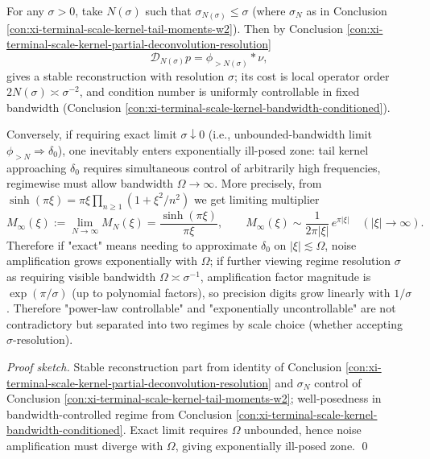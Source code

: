 \begin{conclusion}\label{con:xi-terminal-scale-kernel-two-regime-recoverability}
For any \(\sigma>0\), take \(N(\sigma)\) such that \(\sigma_{N(\sigma)}\le\sigma\) (where \(\sigma_N\) as in Conclusion \ref{con:xi-terminal-scale-kernel-tail-moments-w2}).
Then by Conclusion \ref{con:xi-terminal-scale-kernel-partial-deconvolution-resolution}
\[
\mathcal D_{N(\sigma)}p=\phi_{>N(\sigma)}*\nu,
\]
gives a stable reconstruction with resolution \(\sigma\); its cost is local operator order \(2N(\sigma)\asymp\sigma^{-2}\), and condition number is uniformly controllable in fixed bandwidth (Conclusion \ref{con:xi-terminal-scale-kernel-bandwidth-conditioned}).
\par
Conversely, if requiring exact limit \(\sigma\downarrow 0\) (i.e., unbounded-bandwidth limit \(\phi_{>N}\Rightarrow\delta_0\)), one inevitably enters exponentially ill-posed zone: tail kernel approaching \(\delta_0\) requires simultaneous control of arbitrarily high frequencies, regimewise must allow bandwidth \(\Omega\to\infty\).
More precisely, from \(\sinh(\pi\xi)=\pi\xi\prod_{n\ge 1}(1+\xi^2/n^2)\) we get limiting multiplier
\[
M_\infty(\xi):=\lim_{N\to\infty}M_N(\xi)=\frac{\sinh(\pi\xi)}{\pi\xi},
\qquad
M_\infty(\xi)\sim \frac{1}{2\pi|\xi|}\,e^{\pi|\xi|}\quad(|\xi|\to\infty).
\]
Therefore if "exact" means needing to approximate \(\delta_0\) on \(|\xi|\lesssim \Omega\), noise amplification grows exponentially with \(\Omega\);
if further viewing regime resolution \(\sigma\) as requiring visible bandwidth \(\Omega\asymp \sigma^{-1}\), amplification factor magnitude is \(\exp(\pi/\sigma)\) (up to polynomial factors), so precision digits grow linearly with \(1/\sigma\).
Therefore "power-law controllable" and "exponentially uncontrollable" are not contradictory but separated into two regimes by scale choice (whether accepting \(\sigma\)-resolution).
\end{conclusion}
\begin{proof}[Proof sketch]
Stable reconstruction part from identity of Conclusion \ref{con:xi-terminal-scale-kernel-partial-deconvolution-resolution} and \(\sigma_N\) control of Conclusion \ref{con:xi-terminal-scale-kernel-tail-moments-w2};
well-posedness in bandwidth-controlled regime from Conclusion \ref{con:xi-terminal-scale-kernel-bandwidth-conditioned}.
Exact limit requires \(\Omega\) unbounded, hence noise amplification must diverge with \(\Omega\), giving exponentially ill-posed zone. \qed
\end{proof}

